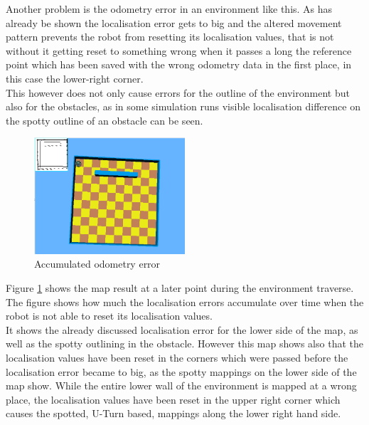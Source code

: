 Another problem is the odometry error in an environment like this. As has already be shown the localisation error gets to big and the altered movement pattern prevents the robot from resetting its localisation values, that is not without it getting reset to something wrong when it passes a long the reference point which has been saved with the wrong odometry data in the first place, in this case the lower-right corner. \\
This however does not only cause errors for the outline of the environment but also for the obstacles, as in some simulation runs visible localisation difference on the spotty outline of an obstacle can be seen. \\[3ex]

\begin{figure}[h]
\centering
\includegraphics[width = 0.5\textwidth]{../../figures/map_results/one_obstacle_odometry_error.png}
\caption{Accumulated odometry error}
\label{one_obstacle_odometry_error}
\end{figure}

Figure \ref{one_obstacle_odometry_error} shows the map result at a later point during the environment traverse. The figure shows how much the localisation errors accumulate  over time when the robot is not able to reset its localisation values. \\
It shows the already discussed localisation error for the lower side of the map, as well as the spotty outlining in the obstacle. However this map shows also that the localisation values have been reset in the corners which were passed before the localisation error became to big, as the spotty mappings on the lower side of the map show. While the entire lower wall of the environment is mapped at a wrong place, the localisation values have been reset in the upper right corner which causes the spotted, U-Turn based,  mappings along the lower right hand side.\\

